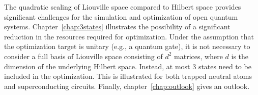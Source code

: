 The quadratic scaling of Liouville space compared to Hilbert space provides
significant challenges for the simulation and optimization of open quantum
systems. Chapter~\ref{chap:3states} illustrates the possibility of a significant
reduction in the resources required for optimization. Under the assumption that
the optimization target is unitary (e.g., a quantum gate), it is not necessary
to consider a full basis of Liouville space consisting of $d^2$ matrices, where
$d$ is the dimension of the underlying Hilbert space. Instead, at most 3 states
need to be included in the optimization. This is illustrated for both trapped
neutral atoms and superconducting circuits.
Finally, chapter~\ref{chap:outlook} gives an outlook.

